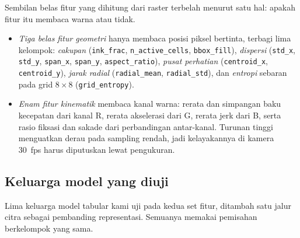 \documentclass{article}
\begin{document}
Sembilan belas fitur yang dihitung dari raster terbelah menurut satu hal: apakah fitur itu
membaca warna atau tidak.

\begin{itemize}
\item \emph{Tiga belas fitur geometri} hanya membaca posisi piksel bertinta, terbagi lima
      kelompok: \emph{cakupan} (\texttt{ink\_frac}, \texttt{n\_active\_cells},
      \texttt{bbox\_fill}), \emph{dispersi} (\texttt{std\_x}, \texttt{std\_y},
      \texttt{span\_x}, \texttt{span\_y}, \texttt{aspect\_ratio}), \emph{pusat perhatian}
      (\texttt{centroid\_x}, \texttt{centroid\_y}), \emph{jarak radial}
      (\texttt{radial\_mean}, \texttt{radial\_std}), dan \emph{entropi} sebaran pada grid
      $8 \times 8$ (\texttt{grid\_entropy}).
\item \emph{Enam fitur kinematik} membaca kanal warna: rerata dan simpangan baku kecepatan
      dari kanal R, rerata akselerasi dari G, rerata jerk dari B, serta rasio fiksasi dan
      sakade dari perbandingan antar-kanal. Turunan tinggi menguatkan derau pada sampling
      rendah, jadi kelayakannya di kamera 30~fps harus diputuskan lewat pengukuran.
\end{itemize}

\subsection*{Keluarga model yang diuji}
\label{sec:tp-model}

Lima keluarga model tabular kami uji pada kedua set fitur, ditambah satu jalur citra sebagai
pembanding representasi. Semuanya memakai pemisahan berkelompok yang sama.
\end{document}
